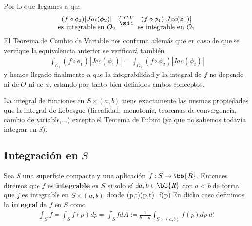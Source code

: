 Por lo que llegamos a que 
\begin{gather*}
    \begin{array}{c}
        (f \circ \phi_2)|Jac(\phi_2)|\\
        \text{es integrable en $O_2$}
    \end{array}
    \overset{T.C.V.}{\sii}
    \begin{array}{c}
        (f\circ \phi_1)|Jac(\phi_1)|\\
        \text{es integrable en $O_1$}
    \end{array}
\end{gather*}
El Teorema de Cambio de Variable nos confirma además que en caso de que se verifique la equivalencia anterior se verificará también
\begin{gather*}
    \int_{O_1} (f\circ \phi_1)|Jac(\phi_1)| = \int_{O_2} (f\circ \phi_2)|Jac(\phi_2)|
\end{gather*}
y hemos llegado finalmente a que la integrabilidad y la integral de $f$ no depende ni de $O$ ni de $\phi$, estando por tanto bien definidos ambos conceptos. 

\begin{observacion}
    La integral de funciones en $S\times(a,b)$ tiene exactamente las mismas propiedades que la integral de Lebesgue (linealidad, monotonía, teoremas de convergencia, cambio de variable,...) excepto el Teorema de Fubini (ya que no sabemos todavía integrar en $S$).
\end{observacion}

\subsection{Integración en $S$}

\begin{definicion}
    Sea $S$ una superficie compacta y una aplicación $f:S\to \bb{R}$. Entonces diremos que $f$ es \textbf{integrable} en $S$ si solo sí $\exists a,b\in \bb{R}$ con $a<b$ de forma que $\tilde{f}$ es integrable en $S\times(a,b)$ donde
         {(p,t)}{(p,t)=f(p)}
    En dicho caso definimos la \textbf{integral} de $f$ en $S$ como 
    \begin{gather*}
        \int_S f = \int_S f(p) dp = \int_S f dA := \frac{1}{b-a} \int_{S\times(a,b)} f(p) dp\ dt
    \end{gather*}
\end{definicion}

